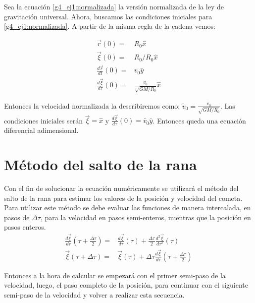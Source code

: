 \documentclass[../portafolio.tex]{subfiles}
\begin{document}
Sea la ecuación \eqref{g4_ej1:normalizada} la versión normalizada de la ley de gravitación universal.
Ahora, buscamos las condiciones iniciales para \eqref{g4_ej1:normalizada}. 
A partir de la misma regla de la cadena vemos:

\begin{align}
\vec{r}(0)=&R_0 \hat{x}\\
\vec{\xi}(0)=& R_0 /R_0 \hat{x}\\
\frac{d\vec{r}}{dt}(0)=& v_0 \hat{y} \\
\frac{d\vec{\xi}}{d\tau}(0)=&\frac{v_0} {\sqrt{GM/R_0}}\hat{x}
\end{align}

Entonces la velocidad normalizada la describiremos como: $\tilde{v}_0=\frac{v_0} {\sqrt{GM/R_0}}$. Las condiciones iniciales serán $\vec{\xi}= \hat{x}$ y $\frac{d\vec{\xi}}{d\tau}(0)=\tilde{v_0} \hat{y}$.
Entonces queda una ecuación diferencial adimensional.
\section{Método del salto de la rana}
Con el fin de solucionar la ecuación numéricamente se utilizará el método del salto de la rana \citep{navarro2024edos} para estimar los valores de la posición y velocidad del cometa.\\
Para utilizar este método se debe evaluar las funciones de manera intercalada, en pasos de $\Delta \tau$, para la velocidad en pasos semi-enteros, mientras que la posición en pasos enteros.
\begin{align}
\frac{d\vec{\xi}}{d \tau}\left(\tau+\frac{\Delta \tau}{2}\right)=&\frac{d\vec{\xi}}{d \tau}(\tau)+\frac{\Delta \tau}{2}\frac{d^2\vec{\xi}}{d \tau^2}(\tau)\\
\vec{\xi}(\tau+\Delta \tau)=&\vec{\xi}(\tau)+\Delta \tau\frac{d\vec{\xi}}{d \tau}\left(\tau+\frac{\Delta \tau}{2}\right)
\end{align}

Entonces a la hora de calcular se empezará con el primer semi-paso de la velocidad, luego, el paso completo de la posición, para continuar con el siguiente semi-paso de la velocidad  y volver a realizar esta secuencia.
\end{document}
